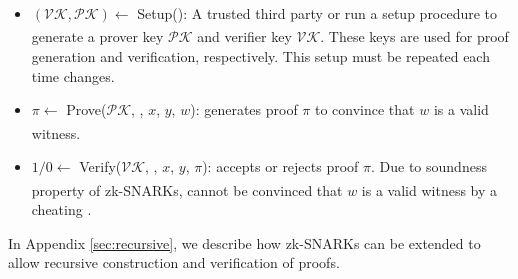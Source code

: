 \begin{itemize}
    \item $(\mathcal{VK, PK})\xleftarrow[]{}$ Setup(\Cir): A trusted third party or \Vrf run a setup procedure to generate a prover key $\mathcal{PK}$ and verifier key $\mathcal{VK}$. These keys are used for proof generation and verification, respectively. This setup must be repeated each time \Cir changes.
    \item $\pi \xleftarrow[]{}$ Prove($\mathcal{PK}$, \Cir, $x$, $y$, $w$): \Prv generates proof $\pi$ to convince \Vrf that $w$ is a valid witness.
    \item $1/0 \xleftarrow[]{}$ Verify($\mathcal{VK}$, \Cir, $x$, $y$, $\pi$): \Vrf accepts or rejects proof $\pi$. Due to soundness property of zk-SNARKs, \Vrf cannot be convinced that $w$ is a valid witness by a cheating \Prv.
\end{itemize}

\noindent In Appendix \ref{sec:recursive}, we describe how zk-SNARKs can be extended to allow recursive construction and verification of proofs.

